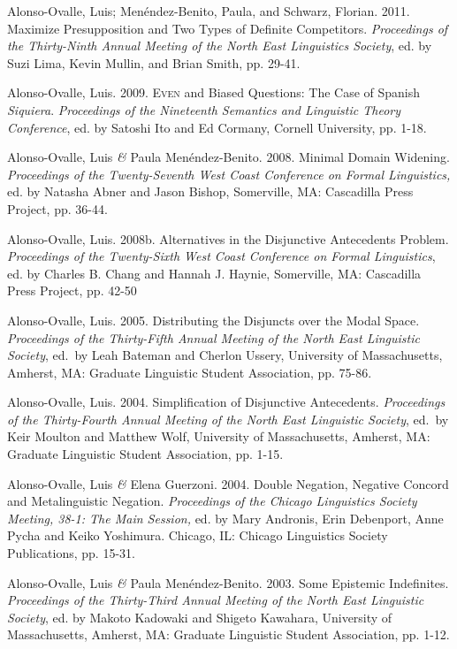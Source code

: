 \documentclass[11pt]{article}
\begin{document}
Alonso-Ovalle, Luis; Men\'endez-Benito, Paula, and Schwarz,
Florian. 2011. Maximize Presupposition and Two Types of Definite
Competitors. \textit{Proceedings of the Thirty-Ninth Annual Meeting of the North East Linguistics
  Society}, ed. by Suzi Lima, Kevin Mullin, and Brian
Smith, pp. 29-41. 


Alonso-Ovalle, Luis. 2009. \textsc{Even} and Biased Questions: The Case of Spanish \textit{Siquiera}. \textit{Proceedings of the Nineteenth Semantics and Linguistic Theory Conference}, ed. by Satoshi Ito and Ed Cormany, Cornell University, pp. 1-18.%


Alonso-Ovalle, Luis \textit{\&} Paula
    Men\'endez-Benito. 2008. Minimal Domain Widening. \textit{Proceedings of the Twenty-Seventh
    West Coast Conference on Formal Linguistics,} ed. by Natasha Abner
  and Jason Bishop,  Somerville, MA: Cascadilla Press Project,
  pp. 36-44.


Alonso-Ovalle, Luis. 2008b. Alternatives in the
  Disjunctive Antecedents Problem. \textit{Proceedings of the Twenty-Sixth
    West Coast Conference on Formal Linguistics}, ed. by Charles
  B. Chang and Hannah J. Haynie, Somerville, MA: Cascadilla Press Project, pp. 42-50


Alonso-Ovalle, Luis. 2005. Distributing the Disjuncts over the Modal Space. \textit{Proceedings of the Thirty-Fifth Annual Meeting of the North East Linguistic Society}, ed.\ by Leah Bateman and Cherlon Ussery,  University of Massachusetts, Amherst, MA: Graduate Linguistic Student Association, pp. 75-86. 

Alonso-Ovalle, Luis. 2004. Simplification of Disjunctive Antecedents. \textit{Proceedings of the Thirty-Fourth Annual Meeting of the North East Linguistic Society}, ed.\ by Keir Moulton and Matthew Wolf,  University of Massachusetts, Amherst, MA: Graduate Linguistic Student Association, pp. 1-15.


Alonso-Ovalle, Luis \textit{\&} Elena Guerzoni. 2004. Double Negation, Negative Concord and Metalinguistic Negation. \textit{Proceedings of the Chicago Linguistics Society Meeting, 38-1: The Main Session,} ed. by Mary Andronis, Erin Debenport, Anne Pycha and Keiko Yoshimura. Chicago, IL: Chicago Linguistics Society Publications, pp. 15-31.



Alonso-Ovalle, Luis \textit{\&} Paula Men\'endez-Benito. 2003. Some Epistemic Indefinites. \textit{Proceedings of the Thirty-Third Annual Meeting of the North East Linguistic Society}, ed. by Makoto Kadowaki and Shigeto Kawahara,  University of Massachusetts, Amherst, MA: Graduate Linguistic Student Association, pp. 1-12. 
\end{document}
